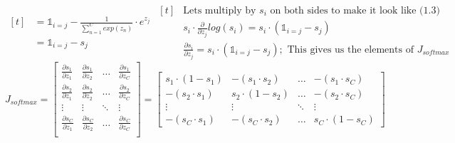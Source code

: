 \documentclass{article}
\begin{document}
\begin{subequations}
\begin{equation}
\begin{aligned}[t]
                                                                    &= \mathds{1}_{i=j} - \frac{1}{\sum\limits_{n=1}^{C}exp(z_{n})} \cdot e^{z_{j}}\\
                                                                    &= \mathds{1}_{i=j} - s_{j}
        \end{aligned}
    \end{equation}
    \begin{equation}
        \begin{aligned}[t]
            &\text{Lets multiply by $s_{i}$ on both sides to make it look like (1.3)}\\
            & s_{i} \cdot \frac{\partial}{\partial z_{j}}log(s_{i}) = s_{i} \cdot \left(\mathds{1}_{i=j} - s_{j}\right)\\
            & \frac{\partial s_{i}}{\partial z_{j}} = s_{i} \cdot \left(\mathds{1}_{i=j} - s_{j}\right); \text{ This gives us the elements of $J_{softmax}$}
        \end{aligned}
    \end{equation}
\end{subequations}
\begin{equation}
    \text{$J_{softmax}$} = 
    \begin{bmatrix}
        \frac{\partial s_{1}}{\partial z_{1}} & \frac{\partial s_{1}}{\partial z_{2}} & \dots & \frac{\partial s_{1}}{\partial z_{C}}\\
        \frac{\partial s_{2}}{\partial z_{1}} & \frac{\partial s_{2}}{\partial z_{2}} & \dots & \frac{\partial s_{2}}{\partial z_{C}}\\
        \vdots & \vdots & \ddots & \vdots\\
        \frac{\partial s_{C}}{\partial z_{1}} & \frac{\partial s_{C}}{\partial z_{2}} & \dots & \frac{\partial s_{C}}{\partial z_{C}}\\
    \end{bmatrix} = 
    \begin{bmatrix}
        s_{1} \cdot (1 - s_{1}) & -(s_{1} \cdot s_{2}) & \dots & -(s_{1} \cdot s_{C})\\
        -(s_{2} \cdot s_{1}) & s_{2} \cdot (1 - s_{2}) & \dots & -(s_{2} \cdot s_{C})\\
        \vdots & \vdots & \ddots & \vdots\\
        -(s_{C} \cdot s_{1}) & -(s_{C} \cdot s_{2}) & \dots & s_{C} \cdot (1 - s_{C})
    \end{bmatrix}
\end{equation}
\end{document}
